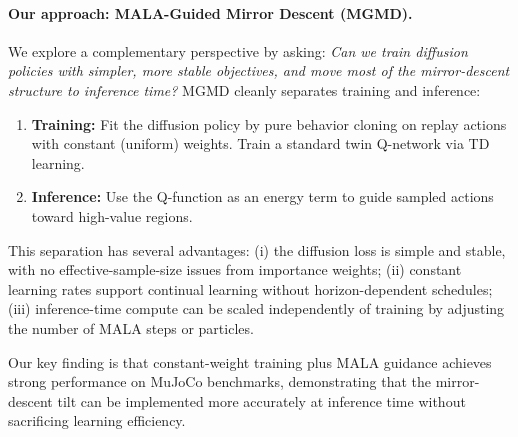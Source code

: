 \documentclass{article}
\theoremstyle{plain}
\theoremstyle{definition}
\theoremstyle{remark}
\begin{document}
\paragraph{Our approach: MALA-Guided Mirror Descent (MGMD).}
We explore a complementary perspective by asking: \emph{Can we train diffusion policies with simpler, more stable objectives, and move most of the mirror-descent structure to inference time?}
MGMD cleanly separates training and inference:
\begin{enumerate}
  \item \textbf{Training:} Fit the diffusion policy by pure behavior cloning on replay actions with constant (uniform) weights. Train a standard twin Q-network via TD learning.
  \item \textbf{Inference:} Use the Q-function as an energy term to guide sampled actions toward high-value regions.
\end{enumerate}
This separation has several advantages: (i) the diffusion loss is simple and stable, with no effective-sample-size issues from importance weights; (ii) constant learning rates support continual learning without horizon-dependent schedules; (iii) inference-time compute can be scaled independently of training by adjusting the number of MALA steps or particles.

Our key finding is that constant-weight training plus MALA guidance achieves strong performance on MuJoCo benchmarks, demonstrating that the mirror-descent tilt can be implemented more accurately at inference time without sacrificing learning efficiency.
\end{document}
